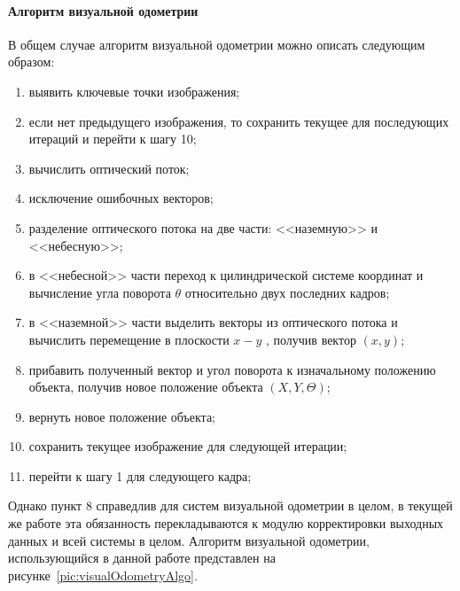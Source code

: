 \paragraph{Алгоритм визуальной одометрии}
В общем случае алгоритм визуальной одометрии можно описать следующим образом:
\begin{enumerate}
\item выявить ключевые точки изображения;
\item если нет предыдущего изображения, то сохранить текущее для последующих итераций и перейти к шагу 10;
\item вычислить оптический поток;
\item исключение ошибочных векторов;
\item разделение оптического потока на две части: <<наземную>> и <<небесную>>;
\item в <<небесной>> части переход к цилиндрической системе координат и вычисление угла поворота $\theta$ относительно двух последних кадров;
\item в <<наземной>> части выделить векторы  из оптического потока  и вычислить перемещение в плоскости  $x-y$ , получив вектор $(x, y)$;
\item прибавить полученный вектор и угол поворота к изначальному положению объекта, получив новое положение объекта $(X, Y, \Theta)$;
\item вернуть новое положение объекта;
\item сохранить текущее изображение для следующей итерации;
\item перейти к шагу 1 для следующего кадра;
\end{enumerate}
	
Однако пункт 8 справедлив для систем визуальной одометрии в целом, в текущей же работе эта обязанность перекладываются к модулю корректировки выходных данных и всей системы в целом. Алгоритм визуальной одометрии, использующийся в данной работе представлен на рисунке~\ref{pic:visualOdometryAlgo}.

